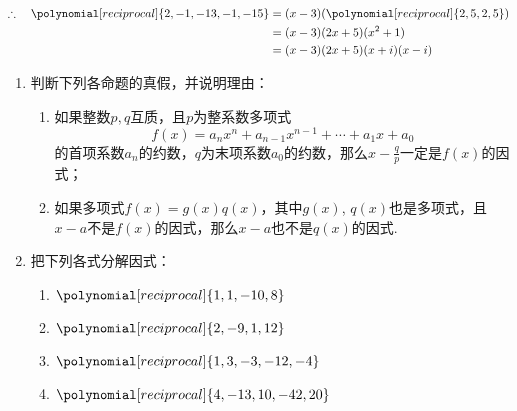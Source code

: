 \begin{solution}
\begin{center}
\end{center}
\[\begin{split}
\therefore\quad \polynomial[reciprocal]{2,-1,-13,-1,-15}&=(x-3)(\polynomial[reciprocal]{2,5,2,5})\\
&=(x-3)(2x+5)(x^2+1)\\
&=(x-3)(2x+5)(x+i)(x-i)
\end{split}\]
\end{solution}

\begin{ex}
\begin{enumerate}
    \item 判断下列各命题的真假，并说明理由：
\begin{enumerate}[(1)]
\item 如果整数$p,q$互质，且$p$为整系数多项式
    $$f(x)=a_nx^n+a_{n-1}x^{n-1}+\cdots +a_1x+a_0$$
    的首项系数$a_n$的约数，$q$为末项系数$a_0$的约数，那么$x-\frac{q}{p}$一定是$f(x)$的因式；
\item 如果多项式$f(x)=g(x)q(x)$，其中$g(x)$, $q(x)$也是多项式，且$x-a$不是$f(x)$的因式，那么$x-a$也不是$q(x)$的因式.
\end{enumerate}
\item 把下列各式分解因式：
\begin{enumerate}[(1)]
    \item $\polynomial[reciprocal]{1,1,-10,8}$
    \item $\polynomial[reciprocal]{2,-9,1,12}$
    \item $\polynomial[reciprocal]{1,3,-3,-12,-4}$
    \item $\polynomial[reciprocal]{4,-13,10,-42,20}$
\end{enumerate}
\end{enumerate}
\end{ex}

